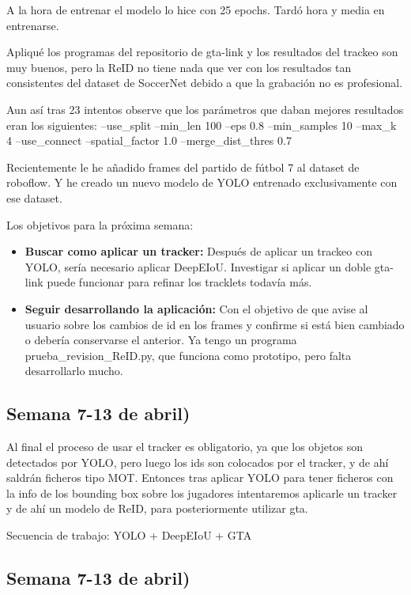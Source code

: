 \documentclass[12pt, a4paper, twoside]{article}
\begin{document}
	A la hora de entrenar el modelo lo hice con 25 epochs. Tardó hora y media en entrenarse.
	
	Apliqué los programas del repositorio de gta-link y los resultados del trackeo son muy buenos, pero la ReID no tiene nada que ver con los resultados tan consistentes del dataset de SoccerNet debido a que la grabación no es profesional.
	
	Aun así tras 23 intentos observe que los parámetros que daban mejores resultados eran los siguientes: --use\_split --min\_len 100 --eps 0.8 --min\_samples 10 --max\_k 4 --use\_connect --spatial\_factor 1.0 --merge\_dist\_thres 0.7   
	
	Recientemente le he añadido frames del partido de fútbol 7 al dataset de roboflow. Y he creado un nuevo modelo de YOLO entrenado exclusivamente con ese dataset.
	
	Los objetivos para la próxima semana:
	
	\begin{itemize}
		\item \textbf{Buscar como aplicar un tracker:} Después de aplicar un trackeo con YOLO, sería necesario aplicar DeepEIoU. Investigar si aplicar un doble gta-link puede funcionar para refinar los tracklets todavía más.
		\item \textbf{Seguir desarrollando la aplicación: } Con el objetivo de que avise al usuario sobre los cambios de id en los frames y confirme si está bien cambiado o debería conservarse el anterior. Ya tengo un programa prueba\_revision\_ReID.py, que funciona como prototipo, pero falta desarrollarlo mucho.
	\end{itemize}
	
	\subsection{Semana 7-13 de abril)}
	
	Al final el proceso de usar el tracker es obligatorio, ya que los objetos son detectados por YOLO, pero luego los ids son colocados por el tracker, y de ahí saldrán ficheros tipo MOT. Entonces tras aplicar YOLO para tener ficheros con la info de los bounding box sobre los jugadores intentaremos aplicarle un tracker y de ahí  un modelo de ReID, para posteriormente utilizar gta.
	
	Secuencia de trabajo: YOLO + DeepEIoU + GTA
	
	\subsection{Semana 7-13 de abril)}
	
\end{document}
